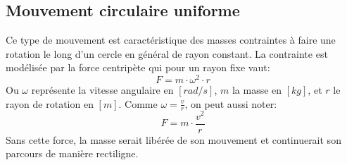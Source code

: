 \subsection{Mouvement circulaire uniforme}
Ce type de mouvement est caractéristique des masses contraintes à faire une rotation le long d'un cercle en général de rayon constant.
La contrainte est modélisée par la force centripète qui pour un rayon fixe vaut:
\begin{equation}
    F=m\cdot \omega^2 \cdot r
\end{equation}
Ou $\omega$ représente la vitesse angulaire en $[rad/s]$, $m$ la masse en $[kg]$, et $r$ le rayon de rotation en $[m]$.
Comme $\omega=\frac{v}{r}$, on peut aussi noter:
\begin{equation}
    F=m\cdot\frac{v^2}{r}
\end{equation}
Sans cette force, la masse serait libérée de son mouvement et continuerait son parcours de manière rectiligne.
